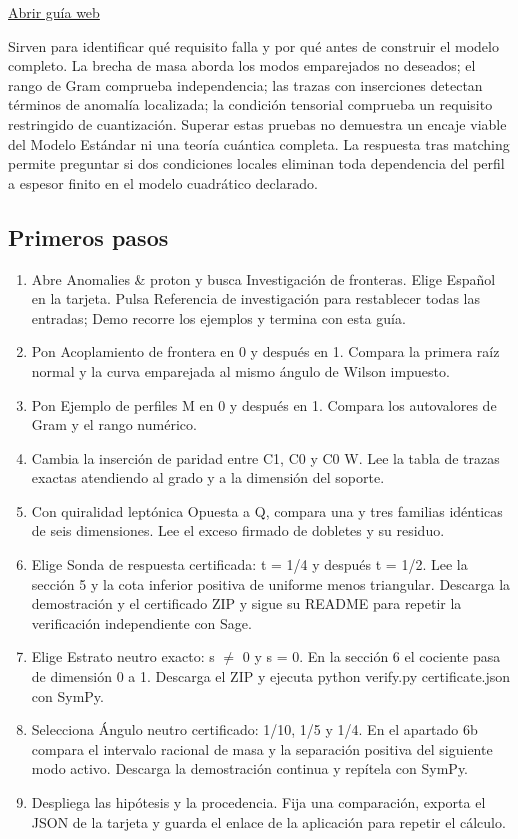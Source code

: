 \documentclass[11pt,a4paper]{article}
\begin{document}
\href{https://karlesmarin.github.io/ghu-explorer/guide/es/boundaryresearch/index.html}{Abrir guía web}

Sirven para identificar qué requisito falla y por qué antes de construir el modelo completo. La brecha de masa aborda los modos emparejados no deseados; el rango de Gram comprueba independencia; las trazas con inserciones detectan términos de anomalía localizada; la condición tensorial comprueba un requisito restringido de cuantización. Superar estas pruebas no demuestra un encaje viable del Modelo Estándar ni una teoría cuántica completa. La respuesta tras matching permite preguntar si dos condiciones locales eliminan toda dependencia del perfil a espesor finito en el modelo cuadrático declarado.
\subsection*{Primeros pasos}
\begin{enumerate}
\item Abre Anomalies \& proton y busca Investigación de fronteras. Elige Español en la tarjeta. Pulsa Referencia de investigación para restablecer todas las entradas; Demo recorre los ejemplos y termina con esta guía.
\item Pon Acoplamiento de frontera en 0 y después en 1. Compara la primera raíz normal y la curva emparejada al mismo ángulo de Wilson impuesto.
\item Pon Ejemplo de perfiles M en 0 y después en 1. Compara los autovalores de Gram y el rango numérico.
\item Cambia la inserción de paridad entre C1, C0 y C0 W. Lee la tabla de trazas exactas atendiendo al grado y a la dimensión del soporte.
\item Con quiralidad leptónica Opuesta a Q, compara una y tres familias idénticas de seis dimensiones. Lee el exceso firmado de dobletes y su residuo.
\item Elige Sonda de respuesta certificada: t = 1/4 y después t = 1/2. Lee la sección 5 y la cota inferior positiva de uniforme menos triangular. Descarga la demostración y el certificado ZIP y sigue su README para repetir la verificación independiente con Sage.
\item Elige Estrato neutro exacto: s \ensuremath{\neq} 0 y s = 0. En la sección 6 el cociente pasa de dimensión 0 a 1. Descarga el ZIP y ejecuta python verify.py certificate.json con SymPy.
\item Selecciona Ángulo neutro certificado: 1/10, 1/5 y 1/4. En el apartado 6b compara el intervalo racional de masa y la separación positiva del siguiente modo activo. Descarga la demostración continua y repítela con SymPy.
\item Despliega las hipótesis y la procedencia. Fija una comparación, exporta el JSON de la tarjeta y guarda el enlace de la aplicación para repetir el cálculo.
\end{enumerate}
\end{document}
